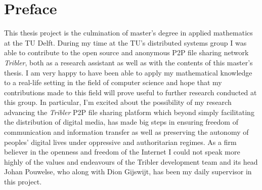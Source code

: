 \chapter*{Preface}

This thesis project is the culmination of master's degree in applied mathematics at the TU Delft. During my time at the TU's distributed systems group I was able to contribute to the open source and anonymous P2P file sharing network {\it Tribler}, both as a research assistant as well as with the contents of this master's thesis. I am very happy to have been able to apply my mathematical knowledge to a real-life setting in the field of computer science and hope that my contributions made to this field will prove useful to further research conducted at this group. In particular, I'm excited about the possibility of my research advancing the {\it Tribler} P2P file sharing platform which beyond simply facilitating the distribution of digital media, has made big steps in ensuring freedom of communication and information transfer as well as preserving the autonomy of peoples' digital lives under oppressive and authoritarian regimes. As a firm believer in the openness and freedom of the Internet I could not speak more highly of the values and endeavours of the Tribler development team and its head Johan Pouwelse, who along with Dion Gijswijt, has been my daily supervisor in this project. \vspace{1em}\\

